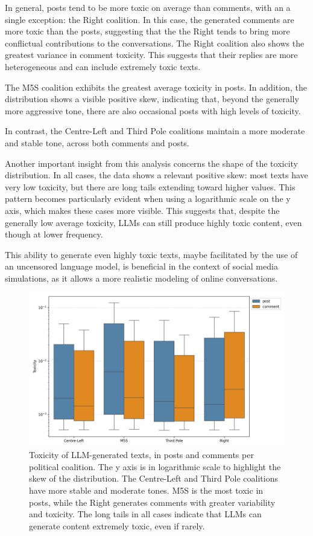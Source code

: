 In general, posts tend to be more toxic on average than comments, with an a single exception: the Right coalition.
In this case, the generated comments are more toxic than the posts, suggesting that the the Right tends to bring more conflictual contributions to the conversations.
The Right coalition also shows the greatest variance in comment toxicity.
This suggests that their replies are more heterogeneous and can include extremely toxic texts.

The M5S coalition exhibits the greatest average toxicity in posts.
In addition, the distribution shows a visible positive skew, indicating that, beyond the generally more aggressive tone, there are also occasional posts with high levels of toxicity.

In contrast, the Centre-Left and Third Pole coalitions maintain a more moderate and stable tone, across both comments and posts.

Another important insight from this analysis concerns the shape of the toxicity distribution.
In all cases, the data shows a relevant positive skew: most texts have very low toxicity, but there are long tails extending toward higher values.
This pattern becomes particularly evident when using a logarithmic scale on the y axis, which makes these cases more visible.
This suggests that, despite the generally low average toxicity, LLMs can still produce highly toxic content, even though at lower frequency.

This ability to generate even highly toxic texts, maybe facilitated by the use of an uncensored language model, is beneficial in the context of social media simulations, as it allows a more realistic modeling of online conversations.


\begin{figure}[h]
    \centering
    \includegraphics[width=0.6\linewidth]{Images/Toxicity/box_posts_vs_comments.png}
    \caption{
    Toxicity of LLM-generated texts, in posts and comments per political coalition.
    The y axis is in logarithmic scale to highlight the skew of the distribution.
    The Centre-Left and Third Pole coalitions have more stable and moderate tones.
    M5S is the most toxic in posts, while the Right generates comments with greater variability and toxicity.
    The long tails in all cases indicate that LLMs can generate content extremely toxic, even if rarely.
    }
    \label{fig:toxicity_box}
\end{figure}


